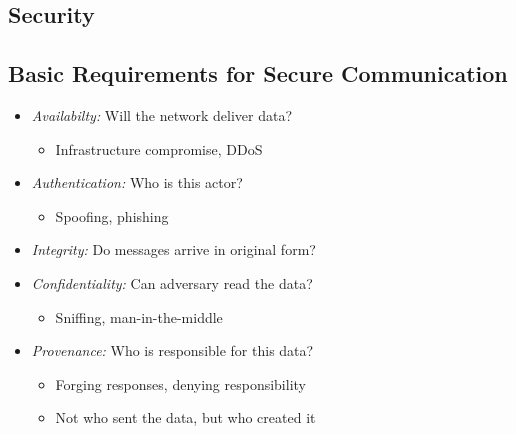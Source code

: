 \subsection{Security}
\subsection{Basic Requirements for Secure Communication}
\begin{itemize}[nosep]
    \item \emph{Availabilty:} Will the network deliver data?
          \begin{itemize}[nosep]
              \item Infrastructure compromise, DDoS
          \end{itemize}
    \item \emph{Authentication:} Who is this actor?
          \begin{itemize}[nosep]
              \item Spoofing, phishing
          \end{itemize}
    \item \emph{Integrity:} Do messages arrive in original form?
    \item \emph{Confidentiality:} Can adversary read the data?
          \begin{itemize}[nosep]
              \item Sniffing, man-in-the-middle
          \end{itemize}
    \item \emph{Provenance:} Who is responsible for this data?
          \begin{itemize}[nosep]
              \item Forging responses, denying responsibility
              \item Not who sent the data, but who created it
          \end{itemize}
\end{itemize}

